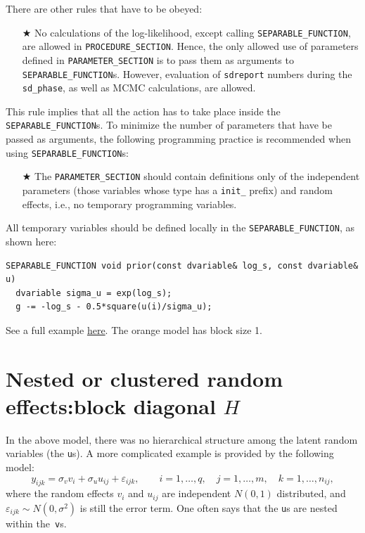 \documentclass{admbmanual}
\begin{document}
There are other rules that have to be obeyed:
\begin{itemize}
  \item[$\bigstar$] No calculations of the log-likelihood, except calling
  \texttt{SEPARABLE\_FUNCTION}, are allowed in \texttt{PROCEDURE\_SECTION}.
  Hence, the only allowed use of parameters defined in
  \texttt{PARAMETER\_SECTION} is to pass them as arguments to
  \texttt{SEPARABLE\_FUNCTION}s. However, evaluation of \texttt{sdreport}
  numbers during the \texttt{sd\_phase}, as well as MCMC calculations, are
  allowed.
\end{itemize}
This rule implies that all the action has to take place inside the
\texttt{SEPARABLE\_FUNCTION}s. To minimize the number of parameters that have be
passed as arguments, the following programming practice is recommended when
using \texttt{SEPARABLE\_FUNCTION}s:
\begin{itemize}
  \item[$\bigstar$] The \texttt{PARAMETER\_SECTION} should contain definitions
  only of the independent parameters (those variables whose type has a
  \texttt{init\_} prefix) and random effects, i.e., no temporary programming
  variables.
\end{itemize}
All temporary variables should be defined locally in the
\texttt{SEPARABLE\_FUNCTION}, as shown here:
\begin{lstlisting}
SEPARABLE_FUNCTION void prior(const dvariable& log_s, const dvariable& u)
  dvariable sigma_u = exp(log_s);
  g -= -log_s - 0.5*square(u(i)/sigma_u);
\end{lstlisting}

See a full example
\href{http://otter-rsch.com/admbre/examples/orange/orange.html}{here}. The
orange model has block size 1.

\section{Nested or clustered random effects:\br block diagonal $H$}
\label{sec:nested}

In the above model, there was no hierarchical structure among the latent random
variables (the \texttt{u}s). A more complicated example is provided by the
following model:
\[
y_{ijk}= \sigma_v v_i + \sigma_u u_{ij}+\varepsilon_{ijk},
\qquad i=1,\ldots,q,\quad j=1,\ldots,m,\quad k=1,\ldots,n_{ij},
\]
where the random effects $v_i$ and $u_{ij}$ are independent
$N(0,1)$ distributed, and $\varepsilon_{ijk}\sim N(0,\sigma^2)$ is still the
error term. One often says that the \texttt{u}s are nested within
the~\texttt{v}s.
\end{document}
